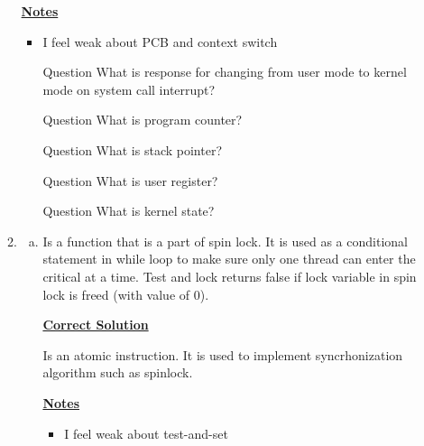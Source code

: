 \documentclass[12pt]{article}
\begin{document}
\begin{enumerate}[1.]
\begin{enumerate}[1)]
\begin{mdframed}
        \end{mdframed}

        \bigskip

        \underline{\textbf{Notes}}

        \begin{itemize}
            \item I feel weak about PCB and context switch
            \item [\color{blue}Question\color{black}] What is response for changing from user mode to kernel mode on system call interrupt?
            \item [\color{blue}Question\color{black}] What is program counter?
            \item [\color{blue}Question\color{black}] What is stack pointer?
            \item [\color{blue}Question\color{black}] What is user register?
            \item [\color{blue}Question\color{black}] What is kernel state?
        \end{itemize}

        \item

        \begin{enumerate}[a)]
            \item Is a function that is a part of spin lock. It is used as a conditional statement in while
            loop to make sure only one thread can enter the critical at a time. Test and lock returns false
            if lock variable in spin lock is freed (with value of 0).

            \bigskip

            \begin{mdframed}
            \underline{\textbf{Correct Solution}}

            \bigskip

            Is an atomic instruction. It is used to implement syncrhonization algorithm such as spinlock.

            \end{mdframed}

            \bigskip

            \underline{\textbf{Notes}}

            \begin{itemize}
                \item I feel weak about test-and-set
            \end{itemize}


\end{enumerate}
\end{enumerate}
\end{enumerate}
\end{document}
